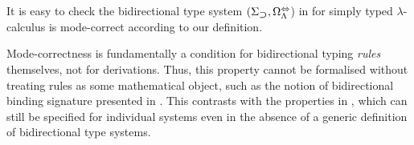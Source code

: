 It is easy to check the bidirectional type system $(\Sigma_{\mathbin{\bm{\supset}}}, \Omega^{\Leftrightarrow}_{\Lambda}$) in  for simply typed $\lambda$-calculus is mode-correct according to our definition.

\begin{remark}
  Mode-correctness is fundamentally a condition for bidirectional typing \emph{rules} themselves, not for derivations.
  Thus, this property cannot be formalised without treating rules as some mathematical object, such as the notion of bidirectional binding signature presented in .
  This contrasts with the properties in , which can still be specified for individual systems even in the absence of a generic definition of bidirectional type systems.
\end{remark}

